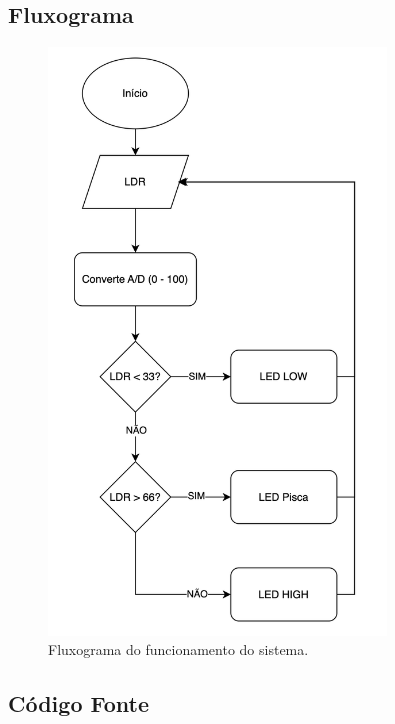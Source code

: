 \documentclass[12pt, a4paper]{article}
\begin{document}
\subsection{Fluxograma}
\begin{figure}[H]
	\centering
	\includegraphics[width=0.8\textwidth]{fluxograma_trabalho_03.png}
	\caption{Fluxograma do funcionamento do sistema.}
	\label{fig:fluxograma_sistema}
\end{figure}

\subsection{Código Fonte}

\begin{mybox}[label={lst:codigo_servidor},title={Código}]{}
	\inputminted[fontsize=\footnotesize,breaklines,linenos]{cpp}{./arduino/main.ino}
\end{mybox}
\end{document}
